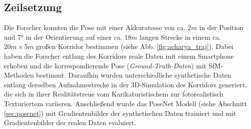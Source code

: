 \subsection{Zeilsetzung}

Die Forscher \citet{acharyaBIMPoseNetIndoorCamera2019} konnten die Pose mit einer Akkuratesse von ca. $2m$ in der Position und 7° in der Orientierung auf einer ca. 18$m$ langen Strecke in einem ca. $20m \times 5m$ großen Korridor bestimmen (siehe Abb. \ref{fig:acharya_traj}). Dabei haben die Forscher entlang des Korridors reale Daten mit einem Smartphone erhoben und die korrespondierende Pose (\textit{Ground-Truth-Daten}) mit SfM-Methoden bestimmt. Daraufhin wurden unterschiedliche synthetische Daten entlang derselben Aufnahmestrecke in der 3D-Simulation des Korridors generiert, die sich in ihrer Realitätstreue vom Karikaturistischem zur fotorealistisch Texturiertem variieren. Anschließend wurde das PoseNet Modell (siehe Abschnitt \ref{sec:posenet}) mit Gradientenbilder der synthetischen Daten trainiert und mit Gradientenbilder der realen Daten evaluiert.
